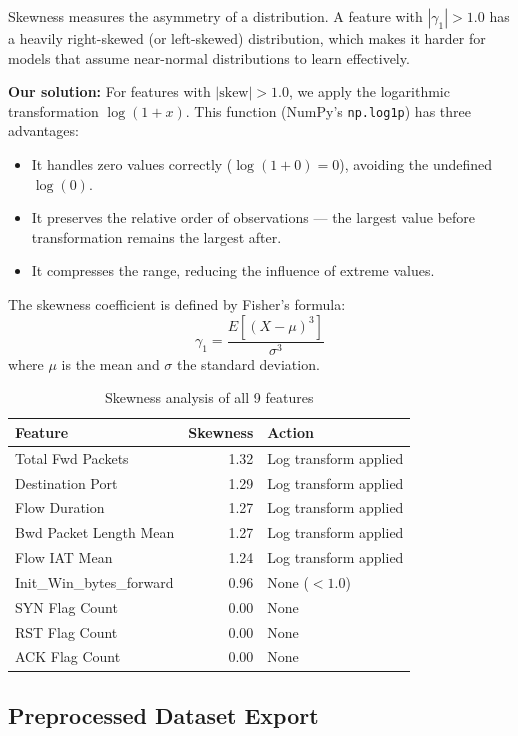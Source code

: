 Skewness measures the asymmetry of a distribution. A feature with $|\gamma_1| > 1.0$ has a heavily right-skewed (or left-skewed) distribution, which makes it harder for models that assume near-normal distributions to learn effectively.

\textbf{Our solution:} For features with $|\text{skew}| > 1.0$, we apply the logarithmic transformation $\log(1 + x)$. This function (NumPy's \texttt{np.log1p}) has three advantages:
\begin{itemize}
    \item It handles zero values correctly ($\log(1 + 0) = 0$), avoiding the undefined $\log(0)$.
    \item It preserves the relative order of observations --- the largest value before transformation remains the largest after.
    \item It compresses the range, reducing the influence of extreme values.
\end{itemize}

The skewness coefficient is defined by Fisher's formula:
\begin{equation}
    \gamma_1 = \frac{E[(X - \mu)^3]}{\sigma^3}
\end{equation}
where $\mu$ is the mean and $\sigma$ the standard deviation.

\begin{table}[H]
\centering
\caption{Skewness analysis of all 9 features}
\label{tab:skewness}
\begin{tabular}{lrl}
\toprule
\textbf{Feature} & \textbf{Skewness} & \textbf{Action} \\
\midrule
Total Fwd Packets & 1.32 & Log transform applied \\
Destination Port & 1.29 & Log transform applied \\
Flow Duration & 1.27 & Log transform applied \\
Bwd Packet Length Mean & 1.27 & Log transform applied \\
Flow IAT Mean & 1.24 & Log transform applied \\
Init\_Win\_bytes\_forward & 0.96 & None ($< 1.0$) \\
SYN Flag Count & 0.00 & None \\
RST Flag Count & 0.00 & None \\
ACK Flag Count & 0.00 & None \\
\bottomrule
\end{tabular}
\end{table}

\subsection{Preprocessed Dataset Export}

